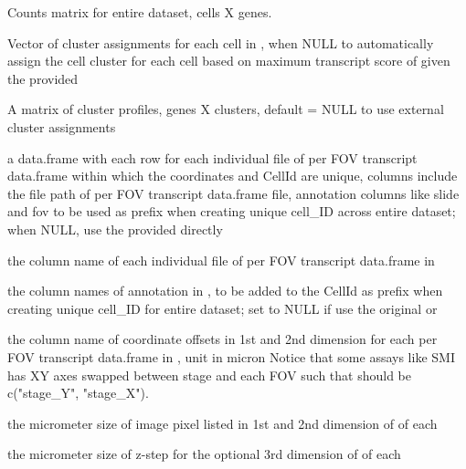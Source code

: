 \documentclass[letterpaper]{book}
\begin{document}
\begin{Arguments}
\begin{ldescription}
\item[\code{counts}] Counts matrix for entire dataset, cells X genes.

\item[\code{clust}] Vector of cluster assignments for each cell in , when NULL to automatically assign the cell cluster for each cell based on maximum transcript score of given the provided 

\item[\code{refProfiles}] A matrix of cluster profiles, genes X clusters, default = NULL to use external cluster assignments

\item[\code{transDF\_fileInfo}] a data.frame with each row for each individual file of per FOV transcript data.frame within which the coordinates and CellId are unique, columns include the file path of per FOV transcript data.frame file, annotation columns like slide and fov to be used as prefix when creating unique cell\_ID across entire dataset; when NULL, use the provided  directly

\item[\code{filepath\_coln}] the column name of each individual file of per FOV transcript data.frame in 

\item[\code{prefix\_colns}] the column names of annotation in , to be added to the CellId as prefix when creating unique cell\_ID for entire dataset; set to NULL if use the original  or 

\item[\code{fovOffset\_colns}] the column name of coordinate offsets in 1st and 2nd dimension for each per FOV transcript data.frame in , unit in micron
Notice that some assays like SMI has XY axes swapped between stage and each FOV such that  should be c("stage\_Y", "stage\_X").

\item[\code{pixel\_size}] the micrometer size of image pixel listed in 1st and 2nd dimension of  of each 

\item[\code{zstep\_size}] the micrometer size of z-step for the optional 3rd dimension of  of each 


\end{ldescription}
\end{Arguments}
\end{document}
